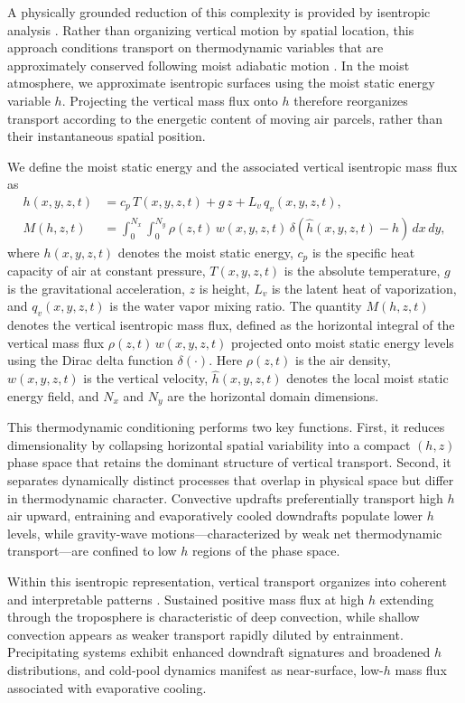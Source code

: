 \documentclass[11pt]{article}
\begin{document}
A physically grounded reduction of this complexity is provided by isentropic analysis \cite{pauluis2013isentropic}. Rather than organizing vertical motion by spatial location, this approach conditions transport on thermodynamic variables that are approximately conserved following moist adiabatic motion \cite{chen2022crucial}. In the moist atmosphere, we approximate isentropic surfaces using the moist static energy variable $h$. Projecting the vertical mass flux onto $h$ therefore reorganizes transport according to the energetic content of moving air parcels, rather than their instantaneous spatial position.

We define the moist static energy and the associated vertical isentropic mass flux as
\begin{align}
    h(x,y,z,t) & = c_p\, T(x,y,z,t)+ g\, z + L_v\, q_v(x,y,z,t),\\ 
    M(h,z,t) &= \int_{0}^{N_x}\int_{0}^{N_y} \rho(z,t)\,w(x,y,z,t)\,
    \delta\!\left(\hat{h}(x,y,z,t)-h\right)\,dx\,dy,
\end{align}
where $h(x,y,z,t)$ denotes the moist static energy, $c_p$ is the specific heat capacity of air at constant pressure, $T(x,y,z,t)$ is the absolute temperature, $g$ is the gravitational acceleration, $z$ is height, $L_v$ is the latent heat of vaporization, and $q_v(x,y,z,t)$ is the water vapor mixing ratio. The quantity $M(h,z,t)$ denotes the vertical isentropic mass flux, defined as the horizontal integral of the vertical mass flux $\rho(z,t)\,w(x,y,z,t)$ projected onto moist static energy levels using the Dirac delta function $\delta(\cdot)$. Here $\rho(z,t)$ is the air density, $w(x,y,z,t)$ is the vertical velocity, $\hat{h}(x,y,z,t)$ denotes the local moist static energy field, and $N_x$ and $N_y$ are the horizontal domain dimensions.

This thermodynamic conditioning performs two key functions. First, it reduces dimensionality by collapsing horizontal spatial variability into a compact $(h,z)$ phase space that retains the dominant structure of vertical transport. Second, it separates dynamically distinct processes that overlap in physical space but differ in thermodynamic character. Convective updrafts preferentially transport high $h$ air upward, entraining and evaporatively cooled downdrafts populate lower $h$ levels, while gravity-wave motions—characterized by weak net thermodynamic transport—are confined to low $h$ regions of the phase space\citep{chen2018atmospheric, chen2020significant}.

Within this isentropic representation, vertical transport organizes into coherent and interpretable patterns \citep{mrowiec2016isentropic}. Sustained positive mass flux at high $h$ extending through the troposphere is characteristic of deep convection, while shallow convection appears as weaker transport rapidly diluted by entrainment. Precipitating systems exhibit enhanced downdraft signatures and broadened $h$ distributions, and cold-pool dynamics manifest as near-surface, low-$h$ mass flux associated with evaporative cooling.
\end{document}
